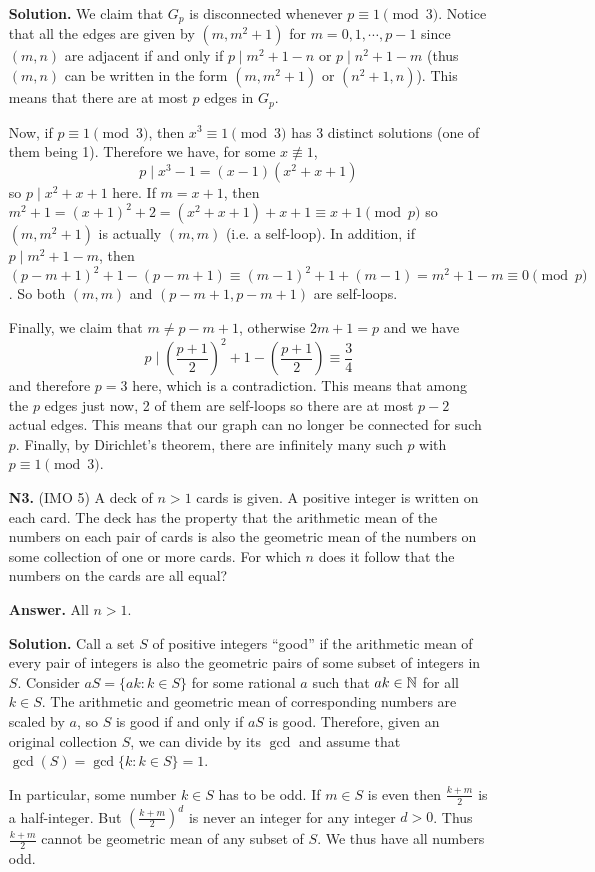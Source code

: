 \documentclass[11pt,a4paper]{article}
\begin{document}
\begin{enumerate}
	\textbf{Solution.} We claim that $G_p$ is disconnected whenever $p\equiv 1\pmod{3}$. Notice that all the edges are given by $(m, m^2+1)$ for $m=0, 1, \cdots , p-1$ since $(m, n)$ are adjacent if and only if $p\mid m^2+1-n$ or $p\mid n^2+1-m$ (thus $(m, n)$ can be written in the form $(m, m^2+1)$ or $(n^2+1, n)$). 
	This means that there are at most $p$ edges in $G_p$. 
	
	Now, if $p\equiv 1\pmod{3}$, then $x^3\equiv 1\pmod{3}$ has 3 distinct solutions (one of them being 1). Therefore we have, for some $x\not\equiv 1$, 
	\[
	p\mid x^3-1=(x-1)(x^2+x+1)
	\]
	so $p\mid x^2+x+1$ here. 
	If $m=x+1$, then $m^2+1=(x+1)^2+2=(x^2+x+1)+x+1\equiv x+1\pmod{p}$ so $(m, m^2+1)$ is actually $(m, m)$ (i.e. a self-loop). 
	In addition, if $p\mid m^2+1-m$, then $(p-m+1)^2+1-(p-m+1)\equiv (m-1)^2+1+(m-1)=m^2+1-m\equiv 0\pmod{p}$. 
	So both $(m, m)$ and $(p-m+1, p-m+1)$ are self-loops. 
	
	Finally, we claim that $m\neq p-m+1$, otherwise $2m+1=p$ and we have 
	\[
	p\mid (\frac{p+1}{2})^2+1-(\frac{p+1}{2})\equiv \frac{3}{4}
	\]
	and therefore $p=3$ here, which is a contradiction. This means that among the $p$ edges just now, 2 of them are self-loops so there are at most $p-2$ actual edges. This means that our graph can no longer be connected for such $p$. Finally, by Dirichlet's theorem, there are infinitely many such $p$ with $p\equiv 1\pmod{3}$. 
	
	\item [\textbf{N3.}] (IMO 5) A deck of $n > 1$ cards is given. A positive integer is written on each card. The deck has the property that the arithmetic mean of the numbers on each pair of cards is also the geometric mean of the numbers on some collection of one or more cards.
	For which $n$ does it follow that the numbers on the cards are all equal?
	
	\textbf{Answer.} All $n>1$. 
	
	\textbf{Solution.} Call a set $S$ of positive integers ``good'' if the arithmetic mean of every pair of integers is also the geometric pairs of some subset of integers in $S$. Consider $aS=\{ak: k\in S\}$ for some rational $a$ such that $ak\in{\mathbb N}$ for all $k\in S$. The arithmetic and geometric mean of corresponding numbers are scaled by $a$, so $S$ is good if and only if $aS$ is good. 
	Therefore, given an original collection $S$, we can divide by its $\gcd$ and assume that $\gcd(S)=\gcd\{k: k\in S\}=1$. 
	
	In particular, some number $k\in S$ has to be odd. If $m\in S$ is even then $\frac{k+m}{2}$ is a half-integer. But $(\frac{k+m}{2})^d$ is never an integer for any integer $d>0$. Thus $\frac{k+m}{2}$ cannot be geometric mean of any subset of $S$. We thus have all numbers odd. 
	

\end{enumerate}
\end{document}
